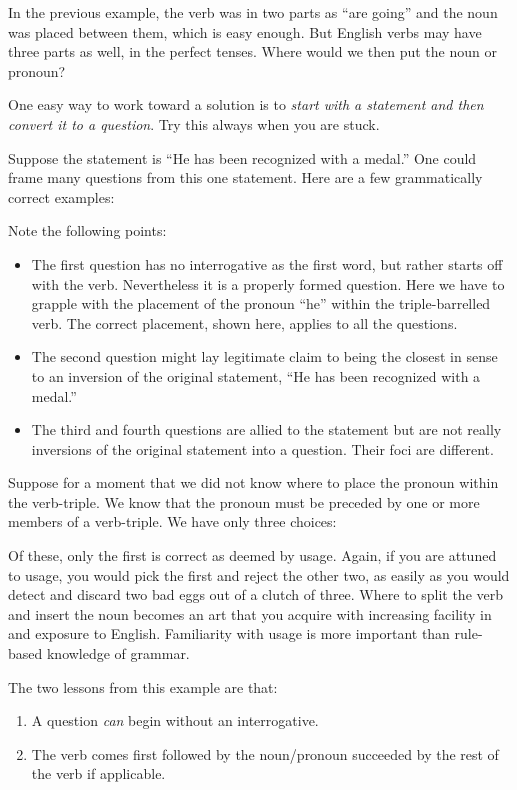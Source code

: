 \documentclass[
  12pt,
  a4paper,
]{article}
\begin{document}
In the previous example, the verb was in two parts as ``are going'' and
the noun was placed between them, which is easy enough. But English
verbs may have three parts as well, in the perfect tenses. Where would
we then put the noun or pronoun?

One easy way to work toward a solution is to \emph{start with a
statement and then convert it to a question}. Try this always when you
are stuck.

Suppose the statement is ``He has been recognized with a medal.'' One
could frame many questions from this one statement. Here are a few
grammatically correct examples:

Note the following points:

\begin{itemize}
\item
  The first question has no interrogative as the first word, but rather
  starts off with the verb. Nevertheless it is a properly formed
  question. Here we have to grapple with the placement of the pronoun
  ``he'' within the triple-barrelled verb. The correct placement, shown
  here, applies to all the questions.
\item
  The second question might lay legitimate claim to being the closest in
  sense to an inversion of the original statement, ``He has been
  recognized with a medal.''
\item
  The third and fourth questions are allied to the statement but are not
  really inversions of the original statement into a question. Their
  foci are different.
\end{itemize}

Suppose for a moment that we did not know where to place the pronoun
within the verb-triple. We know that the pronoun must be preceded by one
or more members of a verb-triple. We have only three choices:

Of these, only the first is correct as deemed by usage. Again, if you
are attuned to usage, you would pick the first and reject the other two,
as easily as you would detect and discard two bad eggs out of a clutch
of three. Where to split the verb and insert the noun becomes an art
that you acquire with increasing facility in and exposure to English.
Familiarity with usage is more important than rule-based knowledge of
grammar.

The two lessons from this example are that:

\begin{enumerate}
\item
  A question \emph{can} begin without an interrogative.
\item
  The verb comes first followed by the noun/pronoun succeeded by the
  rest of the verb if applicable.
\end{enumerate}
\end{document}

